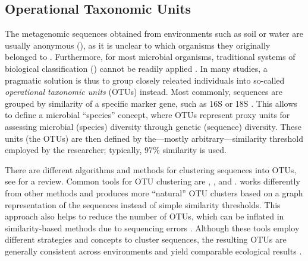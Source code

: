 
\subsection{Operational Taxonomic Units}
\label{ch:Foundations:sec:SequenceAnalysis:sub:OTUs}

The metagenomic sequences obtained from environments such as soil or water are usually anonymous
(),
as it is unclear to which organisms they originally belonged to \cite{Oulas2015}.
Furthermore, for most microbial organisms,
traditional systems of biological classification ()
cannot be readily applied \cite{Blaxter2005}.
In many studies, a pragmatic solution is thus to group closely releated individuals into so-called
\emph{operational taxonomic units} (OTUs) \cite{Sokal1963} instead. 
Most commonly, sequences are grouped by similarity of a specific marker gene, such as 16S or 18S \cite{Blaxter2005}.
This allows to define a microbial ``species'' concept,
where \acp{OTU} represent proxy units for assessing microbial (species) diversity through genetic (sequence) diversity.
These units (the \acp{OTU}) are then defined by the---mostly arbitrary---similarity threshold employed by the researcher;
typically, 97\% similarity is used.

There are different algorithms and methods for clustering sequences into \acp{OTU},
see  for a review.
Common tools for \ac{OTU} clustering are  \cite{Edgar2010},
 \cite{Rognes2016}, and  \cite{Mahe2014,Mahe2015}.
 works differently from other methods and produces more ``natural'' OTU clusters
based on a graph representation of the sequences instead of simple similarity thresholds.
This approach also helps to reduce the number of \acp{OTU},
which can be inflated in similarity-based methods due to sequencing errors \cite{Mahe2015,Kunin2010}.
Although these tools employ different strategies and concepts to cluster sequences,
the resulting \acp{OTU} are generally consistent across environments and yield comparable ecological results \cite{Schmidt2014}.

